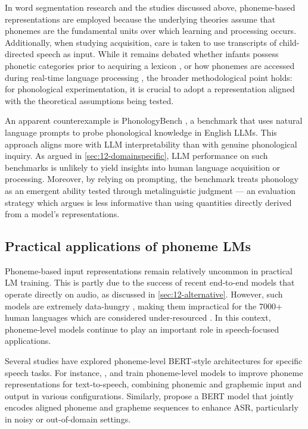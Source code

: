 In word segmentation research and the studies discussed above, phoneme-based representations are employed because the underlying theories assume that phonemes are the fundamental units over which learning and processing occurs. Additionally, when studying acquisition, care is taken to use transcripts of child-directed speech as input. While it remains debated whether infants possess phonetic categories prior to acquiring a lexicon \citep[e.g.][]{feldman_infants_2021}, or how phonemes are accessed during real-time language processing \citep[e.g.][]{mcmurray_myth_2022}, the broader methodological point holds: for phonological experimentation, it is crucial to adopt a representation aligned with the theoretical assumptions being tested.

An apparent counterexample is PhonologyBench \citep{suvarna-etal-2024-phonologybench}, a benchmark that uses natural language prompts to probe phonological knowledge in English LLMs. This approach aligns more with LLM interpretability than with genuine phonological inquiry. As argued in \cref{sec:12-domainspecific}, LLM performance on such benchmarks is unlikely to yield insights into human language acquisition or processing. Moreover, by relying on prompting, the benchmark treats phonology as an emergent ability tested through metalinguistic judgment --- an evaluation strategy which \citet{hu2023prompting} argues is less informative than using quantities directly derived from a model's representations. 

\subsection{Practical applications of phoneme LMs}\label{sec:12-practicalphoneme}

Phoneme-based input representations remain relatively uncommon in practical LM training. This is partly due to the success of recent end-to-end models that operate directly on audio, as discussed in \cref{sec:12-alternative}. However, such models are extremely data-hungry \citep{li2022recent}, making them impractical for the 7000+ human languages which are considered under-resourced \citep{scharenborg2020speech}. In this context, phoneme-level models continue to play an important role in speech-focused applications.

Several studies have explored phoneme-level BERT-style architectures for specific speech tasks. For instance, \citet{jia2021png},  \citet{zhang2022mixed} and \citet{li-2023-phoneme-level-bert} train phoneme-level models to improve phoneme representations for text-to-speech, combining phonemic and graphemic input and output in various configurations. Similarly, \citet{sundararaman-2021-phonemebert} propose a BERT model that jointly encodes aligned phoneme and grapheme sequences to enhance ASR, particularly in noisy or out-of-domain settings.


